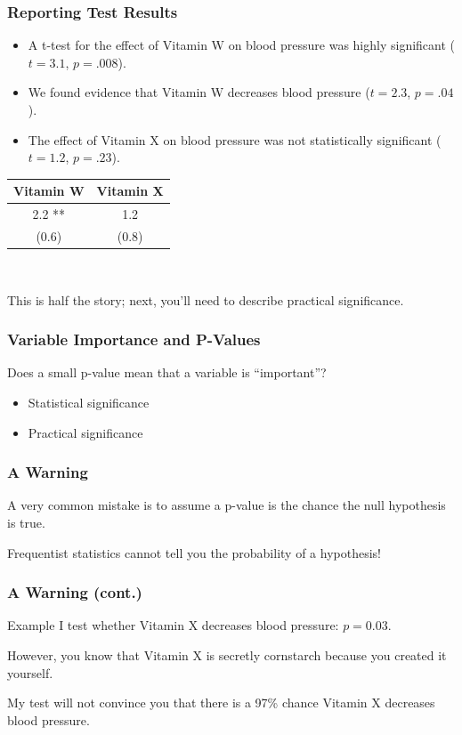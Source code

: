 \documentclass[12pt, block=fill]{beamer}
\begin{document}
\begin{frame}
  \frametitle{Reporting Test Results}
  \begin{itemize}
  \item A t-test for the effect of Vitamin W on blood pressure was
    highly significant ($t=3.1$, $p=.008$).
  \item We found evidence that Vitamin W decreases blood pressure
    ($t=2.3$, $p=.04$).
  \item The effect of Vitamin X on blood pressure was not
    statistically significant ($t=1.2$, $p=.23$).
  \end{itemize}
  \vspace{.5cm}
  \begin{center}
    \begin{tabular}{ c | c }
      Vitamin W & Vitamin X \\
      \hline
      2.2 ** & 1.2 \\
      (0.6) & (0.8) \\
    \end{tabular} \\
  \end{center}

  This is half the story; next, you'll need to describe practical
  significance.

\end{frame}

\begin{frame}[t]
  \frametitle{Variable Importance and P-Values}
  Does a small p-value mean that a variable is ``important''?
  \begin{itemize}
  \item Statistical significance
  \item Practical significance
  \end{itemize} 
\end{frame} 

\begin{frame}
  \frametitle{A Warning}
  
  A very common mistake is to assume a p-value is the chance the null
  hypothesis is true.
  
  Frequentist statistics cannot tell you the probability of a
  hypothesis!

\end{frame}

\begin{frame}
  \frametitle{A Warning (cont.)}
  \begin{exampleblock}{Example}
    I test whether Vitamin X decreases blood pressure: $p = 0.03$.
  
    However, you know that Vitamin X is secretly cornstarch because
    you created it yourself.
  
    My test will not convince you that there is a 97\% chance Vitamin
    X decreases blood pressure.
  \end{exampleblock}
\end{frame}
\end{document}
